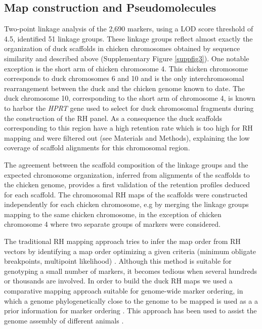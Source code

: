 \documentclass[10pt,letterpaper]{article}
\begin{document}
\subsection*{Map construction and Pseudomolecules}

Two-point linkage analysis of the 2,690 markers, using a LOD score threshold of 4.5, identified 51 linkage groups. These linkage groups reflect almost exactly the organization of duck scaffolds in chicken chromosomes obtained by sequence similarity and described above (Supplementary Figure \ref{suppfig3}). One notable exception is the short arm of chicken chromosome 4. This chicken chromosome corresponds to duck chromosomes 6 and 10 and is the only interchromosomal rearrangement between the duck and the chicken genome known to date. The duck chromosome 10, corresponding to the short arm of chromosome 4, is known to harbor the {\em HPRT} gene used to select for duck chromosomal fragments during the construction of the RH panel. As a consequence the duck scaffolds corresponding to this region have a high retention rate which is too high for RH mapping and were filtered out (see Materials and Methods), explaining the low coverage of scaffold alignments for this chromosomal region.

The agreement between the scaffold composition of the linkage groups and the expected chromosome organization, inferred from alignments of the scaffolds to the chicken genome, provides a first validation of the retention profiles deduced for each scaffold. The chromosomal RH maps of the scaffolds were constructed independently for each chicken chromosome, e.g by merging the linkage groups mapping to the same chicken chromosome, in the exception of chicken chromosome 4 where two separate groups of markers were considered. 

The traditional RH mapping approach tries to infer the map order from RH vectors by identifying a map order optimizing a given criteria (minimum obligate breakpoints, multipoint likelihood) \cite{DeGivry2005,Faraut2009}. 
Although this method is suitable for genotyping a small number of markers, it becomes tedious when several hundreds or thousands are involved. 
In order to build the duck RH maps we used a comparative mapping approach suitable for genome-wide marker ordering, in which a genome phylogenetically close to the genome to be mapped is used as a a prior information for marker ordering \cite{Faraut2007}. This approach has been used to assist the genome assembly of different animals \cite{Dong2013,Jiang2014,Servin2012a}.
\end{document}
